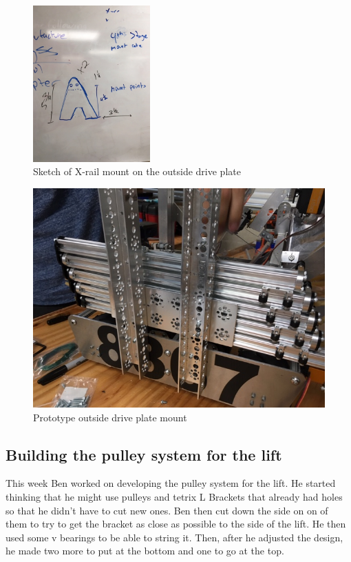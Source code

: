 \documentclass{article}
\begin{document}
\begin{figure}
    \centering
    \includegraphics[height=6cm]{16_12-17/images/x-rail_mount.JPG}
    \caption{Sketch of X-rail mount on the outside drive plate}
    \label{fig:Mount Sketch}
\end{figure}

\begin{figure}
    \centering
    \includegraphics[height=6cmangle=90,origin=c]{16_12-17/images/mount_proto.JPG}
    \caption{Prototype outside drive plate mount}
    \label{Prototype Mount}
\end{figure}

\subsection{Building the pulley system for the lift}

This week Ben worked on developing the pulley system for the lift. He started thinking that he might use pulleys and tetrix L Brackets that already had holes so that he didn't have to cut new ones. Ben then cut down the side on on of them to try to get the bracket as close as possible to the side of the lift. He then used some v bearings to be able to string it. Then, after he adjusted the design, he made two more to put at the bottom and one to go at the top.
\end{document}
